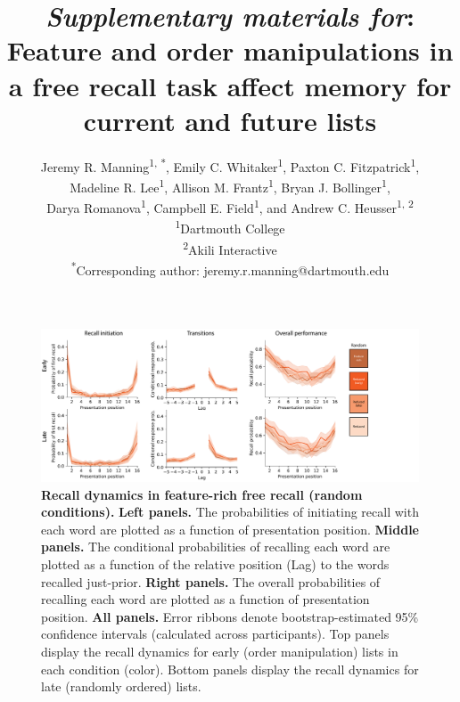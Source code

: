 \documentclass{article}
\title{\textit{Supplementary materials for}: Feature and order manipulations in
a free recall task affect memory for current and future lists}
\author{Jeremy R. Manning\textsuperscript{1, *}, Emily C.
Whitaker\textsuperscript{1}, Paxton C. Fitzpatrick\textsuperscript{1},
\\Madeline R. Lee\textsuperscript{1}, Allison M. Frantz\textsuperscript{1},
Bryan J. Bollinger\textsuperscript{1},\\Darya Romanova\textsuperscript{1},
Campbell E. Field\textsuperscript{1}, and Andrew C. Heusser\textsuperscript{1,
2}\\\textsuperscript{1}Dartmouth College\\\textsuperscript{2}Akili
Interactive\\\textsuperscript{*}Corresponding author:
jeremy.r.manning@dartmouth.edu}
\date{}
\begin{document}
\renewcommand{\figurename}{Supplementary Figure}


\setcounter{equation}{0}
\setcounter{figure}{0}
\setcounter{table}{0}
\setcounter{page}{1}
\setcounter{section}{0}
\makeatletter
\renewcommand{\theequation}{S\arabic{equation}}
\renewcommand{\thefigure}{S\arabic{figure}}
\renewcommand{\bibnumfmt}[1]{[S#1]}
\renewcommand{\citenumfont}[1]{S#1}

\maketitle

\begin{figure}[p] \centering
\includegraphics[width=\textwidth]{figures/recall_dynamics_random}

\caption{\textbf{Recall dynamics in feature-rich free recall (random conditions).} \textbf{Left panels.} The probabilities of
initiating recall with each word are plotted as a function of presentation
position. \textbf{Middle panels.} The conditional probabilities of recalling
each word are plotted as a function of the relative position (Lag) to the words
recalled just-prior. \textbf{Right panels.} The overall probabilities of
recalling each word are plotted as a function of presentation position.
\textbf{All panels.} Error ribbons denote bootstrap-estimated 95\% confidence
intervals (calculated across participants). Top panels display the recall
dynamics for early (order manipulation) lists in each condition (color). Bottom
panels display the recall dynamics for late (randomly ordered) lists.}

    \label{fig:recall-dynamics-random}
\end{figure}
\end{document}
